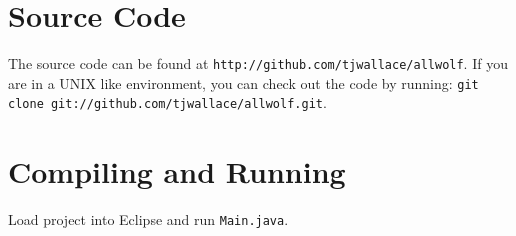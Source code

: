 \documentclass[pdftex,10pt]{article}
\begin{document}
\appendix
\section{Source Code}
The source code can be found at {\tt http://github.com/tjwallace/allwolf}.
If you are in a UNIX like environment, you can check out the code by running: {\tt git clone git://github.com/tjwallace/allwolf.git}.

\section{Compiling and Running}
Load project into Eclipse and run {\tt Main.java}. 
\end{document}
